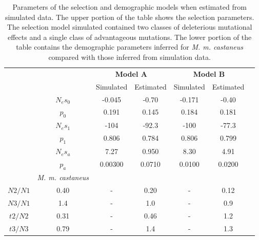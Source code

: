 \begin{table}[h!]
\centering
\caption[Parameters of the selection and demographic models when estimated from simulated data]{Parameters of the selection and demographic models when estimated from simulated data. The upper portion of the table shows the selection parameters. The selection model simulated contained two classes of deleterious mutational effects and a single class of advantageous mutations. The lower portion of the table contains the demographic parameters inferred for \textit{M. m. castaneus} compared with those inferred from simulation data.}
 \begin{tabular}{c c c c c c c} 
 \toprule
	& & 	\multicolumn{2}{c}{\textbf{Model A}}	& \multicolumn{2}{c}{\textbf{Model B}}   \\ 
	& &	Simulated &	Estimated	& Simulated &	Estimated \\ \hline
	&$N_es_0$ &	-0.045	&-0.70 &	-0.171 & 	-0.40 \\
	&$p_0$ &	 0.191	& 0.145	& 0.184	& 0.181 \\
	&$N_es_1$ &	-104	&-92.3&	-100 &	-77.3 \\
	&$p_1$ &	 0.806	&0.784	& 0.806 &	0.799 \\
	&$N_es_a$ & 	7.27	 & 0.950 &	8.30 &	4.91 \\
	&$p_a$ &	 0.00300	&0.0710&	0.0100&	0.0200 \\ \hline
	& \textit{M. m. castaneus} & & & \\ \hline
$N2/N1$	& 0.40	&-	&0.20&	-	&0.12 \\
$N3/N1$	& 1.4	&-	&1.0	&-	&0.9\\
$t2/N2$	& 0.31	&-	&0.46&	-&	1.2\\
$t3/N3$	& 0.79	&-	&1.4	&-	&1.3 \\
\bottomrule

\end{tabular}
\label{tab:C3S6}
\end{table}